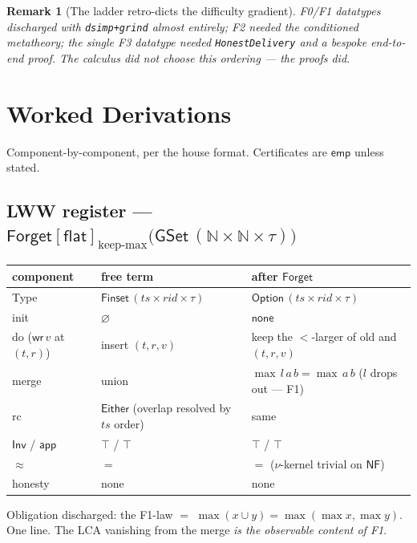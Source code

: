 \documentclass[11pt]{article}
\newtheorem{remark}[theorem]{Remark}
\newcommand{\lean}[1]{\texttt{#1}}
\newcommand{\eqobs}{\approx}
\newcommand{\Inv}{\mathsf{Inv}}
\newcommand{\app}{\mathsf{app}}
\newcommand{\Forget}{\mathsf{Forget}}
\newcommand{\GSet}{\mathsf{GSet}}
\newcommand{\NF}{\mathsf{NF}}
\newcommand{\emp}{\mathsf{emp}}
\newcommand{\Either}{\mathsf{Either}}
\newcommand{\None}{\mathsf{none}}
\newcommand{\ts}{\mathit{ts}}
\newcommand{\rid}{\mathit{rid}}
\renewcommand{\flat}{\mathsf{flat}}
\begin{document}
\begin{remark}[The ladder retro-dicts the difficulty gradient]
F0/F1 datatypes discharged with \lean{dsimp+grind} almost entirely; F2
needed the conditioned metatheory; the single F3 datatype needed
\lean{HonestDelivery} and a bespoke end-to-end proof. The calculus did not
choose this ordering --- the proofs did.
\end{remark}

\section{Worked Derivations}\label{sec:derivations}

Component-by-component, per the house format. Certificates are $\emp$
unless stated.

\subsection{LWW register --- $\Forget[\flat]_{\text{keep-max}}\bigl(\GSet\,(\mathbb{N} \times \mathbb{N} \times \tau)\bigr)$\quad[F1]}

\begin{center}
\small
\begin{tabular}{@{}lll@{}}
\toprule
component & free term & after $\Forget$ \\
\midrule
Type & $\mathsf{Finset}\,(\ts \times \rid \times \tau)$
     & $\mathsf{Option}\,(\ts \times \rid \times \tau)$ \\
init & $\varnothing$ & $\None$ \\
do ($\mathsf{wr}\,v$ at $(t,r)$) & insert $(t,r,v)$
     & keep the $<$-larger of old and $(t,r,v)$ \\
merge & union & $\max\,l\,a\,b = \max\,a\,b$ \quad($l$ drops out --- F1) \\
rc & $\Either$ (overlap resolved by $\ts$ order) & same \\
$\Inv$ / $\app$ & $\top$ / $\top$ & $\top$ / $\top$ \\
$\eqobs$ & $=$ & $=$ \quad($\nu$-kernel trivial on $\NF$) \\
honesty & none & none \\
\bottomrule
\end{tabular}
\end{center}

Obligation discharged: the F1-law $=$
$\max(x \cup y) = \max(\max x, \max y)$. One line. The LCA vanishing from
the merge \emph{is the observable content of F1}.
\end{document}
